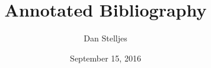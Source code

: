 \documentclass[12pt,letterpaper]{article}
\author{Dan Stelljes}
\date{September 15, 2016}
\title{Annotated Bibliography}
\begin{document}
\maketitle
\nocite{*}



\end{document}
